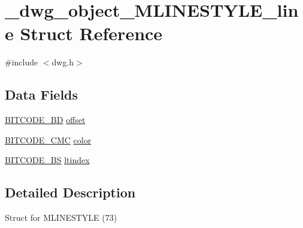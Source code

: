 \hypertarget{struct__dwg__object__MLINESTYLE__line}{\section{\-\_\-dwg\-\_\-object\-\_\-\-M\-L\-I\-N\-E\-S\-T\-Y\-L\-E\-\_\-line \-Struct \-Reference}
\label{struct__dwg__object__MLINESTYLE__line}
}


{\ttfamily \#include $<$dwg.\-h$>$}

\subsection*{\-Data \-Fields}
\begin{DoxyCompactItemize}
\item 
\hyperlink{dwg_8h_a3c1e6781466b74ba07785d57da70ed97}{\-B\-I\-T\-C\-O\-D\-E\-\_\-\-B\-D} \hyperlink{struct__dwg__object__MLINESTYLE__line_a3fdfd0e4c66ab78e70ce365002fec2e0}{offset}
\item 
\hyperlink{dwg_8h_add86ce54dd5e62c8f7f5a870b467919a}{\-B\-I\-T\-C\-O\-D\-E\-\_\-\-C\-M\-C} \hyperlink{struct__dwg__object__MLINESTYLE__line_a6592b5b2bff6c4174d26f19f1ea8eda2}{color}
\item 
\hyperlink{dwg_8h_a94297606fbd4a4ff97e8add284af0809}{\-B\-I\-T\-C\-O\-D\-E\-\_\-\-B\-S} \hyperlink{struct__dwg__object__MLINESTYLE__line_af32840eaffee194c44da13670692c99c}{ltindex}
\end{DoxyCompactItemize}


\subsection{\-Detailed \-Description}
\-Struct for \-M\-L\-I\-N\-E\-S\-T\-Y\-L\-E (73) 

